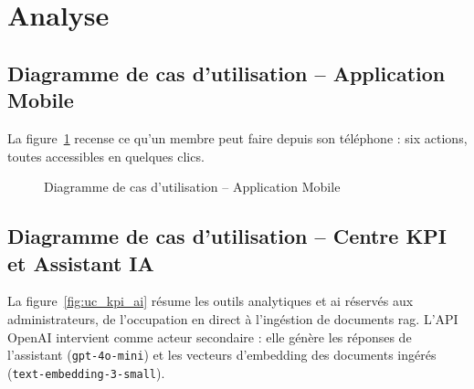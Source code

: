 ﻿\documentclass[../main.tex]{subfiles}
\begin{document}
\section{Analyse}

\subsection{Diagramme de cas d'utilisation -- Application Mobile}

La figure~\ref{fig:uc_mobile} recense ce qu'un membre peut faire depuis son t\'{e}l\'{e}phone : six actions, toutes accessibles en quelques clics.

\begin{figure}[H]
\centering
{}
\caption{Diagramme de cas d'utilisation -- Application Mobile}
\label{fig:uc_mobile}
\end{figure}

\subsection{Diagramme de cas d'utilisation -- Centre KPI et Assistant IA}

La figure~\ref{fig:uc_kpi_ai} r\'{e}sume les outils analytiques et \acrshort{ai} r\'{e}serv\'{e}s aux administrateurs, de l'occupation en direct \`{a} l'ing\'{e}stion de documents \acrshort{rag}. L'API OpenAI intervient comme acteur secondaire : elle g\'{e}n\`{e}re les r\'{e}ponses de l'assistant (\texttt{gpt-4o-mini}) et les vecteurs d'embedding des documents ing\'{e}r\'{e}s (\texttt{text-embedding-3-small}).
\end{document}
